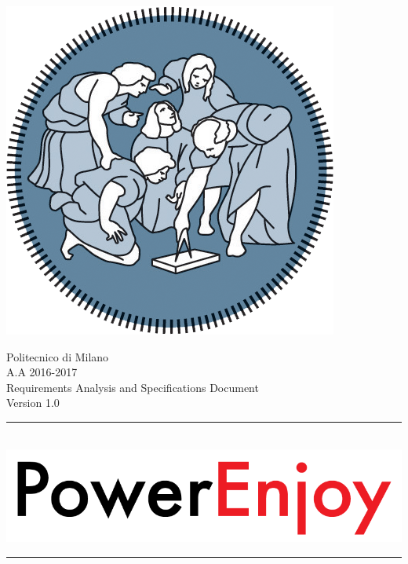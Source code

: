 \documentclass[12pt]{article}
\begin{document}
		 
	 \begin{center}
 	 	\includegraphics[scale=1.5]{Images/PolimiLogo.png}
	 \end{center}

	 \begin{center}
	 	{\Huge Politecnico di Milano}\\
	 	\vspace{5mm}
		{\Large A.A 2016-2017} 
		\vspace{5mm}\\
		{\huge Requirements Analysis and Specifications Document}   
		\vspace{5mm}\\
		{\large Version 1.0}  
     \end{center}
     
     \begin{center}
		\noindent\rule{8cm}{0.8pt}
		 \vspace{5mm}\\
 	 	 \includegraphics[scale=1]{Images/logoPowerEnjoy.png}\\
		\noindent\rule{8cm}{0.8pt}
	 \end{center}
	 	\vspace{5mm}
	
\end{document}
